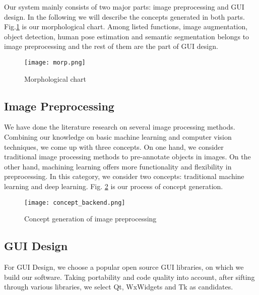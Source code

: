 Our system mainly consists of two major parts: image preprocessing and GUI
design. In the following we will describe the concepts generated in both parts.
Fig.\ref{fig:MorphChart} is our morphological chart. Among listed functions,
image augmentation, object detection, human pose estimation and semantic
segmentation belongs to image preprocessing and the rest of them are the part
of GUI design.
\begin{figure}[h!]
  \centering \texttt{[image: morp.png]}
  \caption{Morphological chart}
  \label{fig:MorphChart}
\end{figure}

\subsection{Image Preprocessing}
We have done the literature research on several image processing methods.
Combining our knowledge on basic machine learning and computer vision
techniques, we come up with three concepts. On one hand, we consider
traditional image processing methods to pre-annotate objects in images. On the
other hand, machining learning offers more functionality and flexibility in
preprocessing. In this category, we consider two concepts: traditional machine
learning and deep learning. Fig. \ref{fig:backend} is our process of concept
generation.
\begin{figure}[h!]
  \centering \texttt{[image: concept\_backend.png]}
  \caption{Concept generation of image preprocessing}
  \label{fig:backend}
\end{figure}


\subsection{GUI Design}
For GUI Design, we choose a popular open source GUI libraries, on which we
build our software. Taking portability and code quality into account, after
sifting through various libraries, we select Qt, WxWidgets and Tk as candidates.
